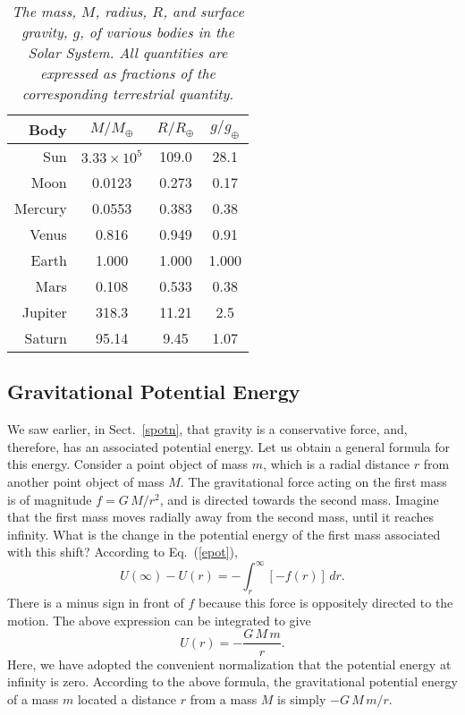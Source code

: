 \begin{table}
\centering
\begin{tabular}{r|ccc}
Body & $M/M_\oplus$ & $R/R_\oplus$ & $g/g_\oplus$\\[0.5ex] \hline
Sun & $3.33\times 10^5$ &  109.0 & 28.1\\[0.5ex]
Moon & 0.0123& 0.273 & 0.17 \\[0.5ex]
Mercury & 0.0553 & 0.383 & 0.38 \\[0.5ex]
Venus & 0.816 & 0.949 &  0.91 \\[0.5ex]
Earth & 1.000 & 1.000 &  1.000\\ [0.5ex]
Mars & 0.108 & 0.533 &  0.38 \\[0.5ex]
Jupiter & 318.3 & 11.21 &2.5\\ [0.5ex]
Saturn & 95.14 & 9.45 & 1.07\\
\end{tabular}
\caption{\em The mass, $M$, radius, $R$, and surface gravity, $g$, of various
bodies in the Solar System. All quantities are expressed as fractions of the
corresponding terrestrial quantity.}\label{tgravity}
\end{table}

\subsection{Gravitational Potential Energy}
We saw earlier, in Sect.~\ref{spotn}, that gravity is a conservative force, and, therefore,
has an associated potential energy. Let us obtain a general formula for this energy.
Consider a point object of mass $m$, which is a radial distance $r$ from another point
object of mass $M$. The gravitational force acting on the first mass is
of magnitude $f = G\,M/r^2$, and is directed towards the second mass. Imagine that the
first mass moves radially away from the second mass, until it reaches infinity. What is
the change in the potential energy of the first mass associated with this shift?
According to Eq.~(\ref{epot}), 
\begin{equation}
 U(\infty) - U(r)  = -\int_{r}^\infty [-f(r)]\,dr.
\end{equation}
There is a minus sign  in front of $f$  because this force is oppositely directed to the motion.
The above expression can be integrated to give
\begin{equation}
U(r) = -\frac{G\,M\,m}{r}.
\end{equation}
Here, we have adopted the convenient normalization that the potential energy at infinity is
zero. According to the above formula, the gravitational potential energy of a mass $m$
located a distance $r$ from a mass $M$ is simply $-G\,M\,m/r$. 


